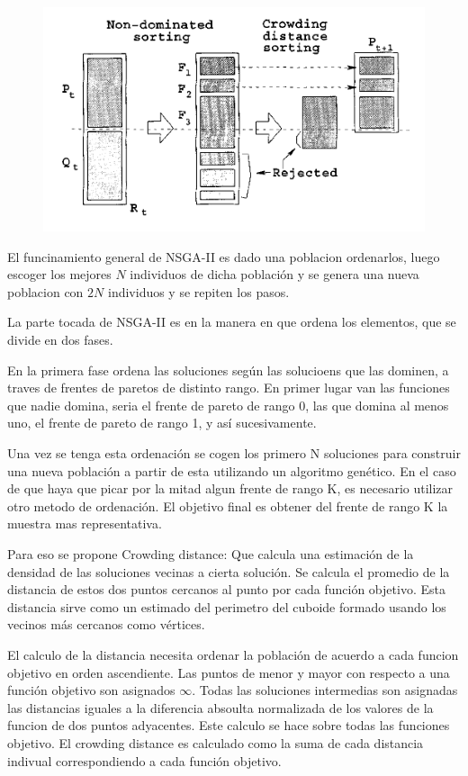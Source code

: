 \begin{figure}
    \includegraphics[width=\linewidth]{Pictures/nsga2.png}
    \label{nsga2}
\end{figure}

El funcinamiento general de NSGA-II es dado una poblacion ordenarlos, luego escoger los mejores $N$ individuos de dicha poblaci\'on y se genera una nueva poblacion con $2N$ individuos y se repiten los pasos.

La parte tocada de NSGA-II es en la manera en que ordena los elementos, que se divide en dos fases.

En la primera fase ordena las soluciones seg\'un las solucioens que las dominen, a traves de frentes de paretos de distinto rango. En primer lugar van las funciones que nadie domina, seria el frente de pareto de rango 0, las que domina al menos uno, el frente de pareto de rango 1, y as\'i sucesivamente.

Una vez se tenga esta ordenaci\'on se cogen los primero N soluciones para construir una nueva poblaci\'on a partir de esta utilizando un algoritmo gen\'etico. En el caso de que haya que picar por la mitad algun frente de rango K, es necesario utilizar otro metodo de ordenaci\'on. El objetivo final es obtener del frente de rango K la muestra mas representativa.

Para eso se propone Crowding distance:
Que calcula una estimaci\'on de la densidad de las soluciones vecinas a cierta soluci\'on. Se calcula el promedio de la distancia de estos dos puntos cercanos al punto por cada funci\'on objetivo. Esta distancia sirve como un estimado del perimetro del cuboide formado usando los vecinos m\'as cercanos como v\'ertices. 

El calculo de la distancia necesita ordenar la poblaci\'on de acuerdo a cada funcion objetivo en orden ascendiente. Las puntos de menor y mayor con respecto a una funci\'on objetivo son asignados $\infty$. Todas las soluciones intermedias son asignadas las distancias iguales a la diferencia absoulta normalizada de los valores de la funcion de dos puntos adyacentes. Este calculo se hace sobre todas las funciones objetivo. El crowding distance es calculado como la suma de cada distancia indivual correspondiendo a cada funci\'on objetivo.

